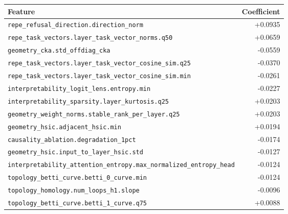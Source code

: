 \begin{tabular}{@{}lr@{}}
\toprule
\textbf{Feature} & \textbf{Coefficient}\\
\midrule
\texttt{repe\_refusal\_direction.direction\_norm} & +0.0935 \\
\texttt{repe\_task\_vectors.layer\_task\_vector\_norms.q50} & +0.0659 \\
\texttt{geometry\_cka.std\_offdiag\_cka} & -0.0559 \\
\texttt{repe\_task\_vectors.layer\_task\_vector\_cosine\_sim.q25} & -0.0370 \\
\texttt{repe\_task\_vectors.layer\_task\_vector\_cosine\_sim.min} & -0.0261 \\
\texttt{interpretability\_logit\_lens.entropy.min} & -0.0227 \\
\texttt{interpretability\_sparsity.layer\_kurtosis.q25} & +0.0203 \\
\texttt{geometry\_weight\_norms.stable\_rank\_per\_layer.q25} & +0.0203 \\
\texttt{geometry\_hsic.adjacent\_hsic.min} & +0.0194 \\
\texttt{causality\_ablation.degradation\_1pct} & -0.0174 \\
\texttt{geometry\_hsic.input\_to\_layer\_hsic.std} & -0.0127 \\
\texttt{interpretability\_attention\_entropy.max\_normalized\_entropy\_head} & -0.0124 \\
\texttt{topology\_betti\_curve.betti\_0\_curve.min} & -0.0124 \\
\texttt{topology\_homology.num\_loops\_h1.slope} & -0.0096 \\
\texttt{topology\_betti\_curve.betti\_1\_curve.q75} & +0.0088 \\
\bottomrule
\end{tabular}